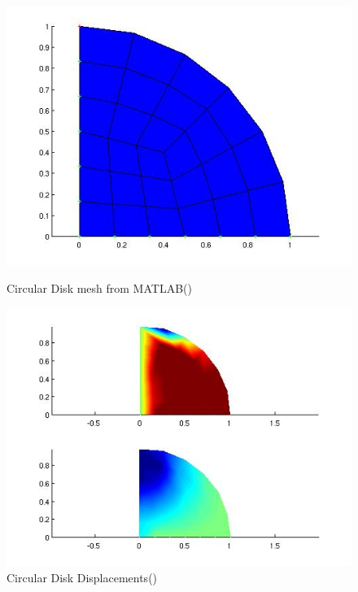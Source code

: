 \begin{figure}[htbp]
\begin{minipage}{0.45\linewidth}
    \includegraphics[width=\linewidth]{fig/circular_disk13_mesh_matlab.jpg}
    \caption{Circular Disk mesh from MATLAB()}
    \label{fig:CircularDisk13MeshMATLAB}
  \end{minipage}
  \hfill
  \begin{minipage}{0.45\linewidth}
    \includegraphics[width=\linewidth]{fig/circular_disk13_disp_matlab.jpg}
    \caption{Circular Disk Displacements()}
    \label{fig:CircularDisk13Displacements}
  \end{minipage}
  \begin{minipage}{0.45\linewidth}

\end{minipage}
\end{figure}
